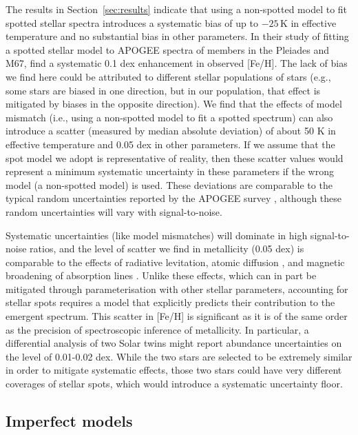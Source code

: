 The results in Section~\ref{sec:results} indicate that using a non-spotted model to fit spotted stellar spectra introduces a systematic bias of up to $-25$\,K in effective temperature and no substantial bias in other parameters. In their study of fitting a spotted stellar model to APOGEE spectra of members in the Pleiades and M67, \citet{cao_starspots_2022} find a systematic 0.1 dex enhancement in observed [Fe/H]. The lack of bias we find here could be attributed to different stellar populations of stars (e.g., some stars are biased in one direction, but in our population, that effect is mitigated by biases in the opposite direction). We find that the effects of model mismatch (i.e., using a non-spotted model to fit a spotted spectrum) can also introduce a scatter (measured by median absolute deviation) of about 50 K in effective temperature and 0.05 dex in other parameters. If we assume that the spot model we adopt is representative of reality, then these scatter values would represent a minimum systematic uncertainty in these parameters if the wrong model (a non-spotted model) is used. These deviations are comparable to the typical random uncertainties reported by the APOGEE survey \citep[150K, 0.13 dex and 0.1 dex;][]{hegedus_comparative_2022}, although these random uncertainties will vary with signal-to-noise. 


Systematic uncertainties (like model mismatches) will dominate in high signal-to-noise ratios, and the level of scatter we find in metallicity (0.05 dex) is comparable to the effects of radiative levitation, atomic diffusion \citep{onehag_abundances_2014}, and magnetic broadening of absorption lines \citep{spina_how_2020}. Unlike these effects, which can in part be mitigated through parameterisation with other stellar parameters, accounting for stellar spots requires a model that explicitly predicts their contribution to the emergent spectrum. This scatter in [Fe/H] is significant as it is of the same order as the precision of spectroscopic inference of metallicity. In particular, a differential analysis of two Solar twins might report abundance uncertainties on the level of 0.01-0.02 dex. While the two stars are selected to be extremely similar in order to mitigate systematic effects, those two stars could have very different coverages of stellar spots, which would introduce a systematic uncertainty floor. 

\subsection{Imperfect models}

